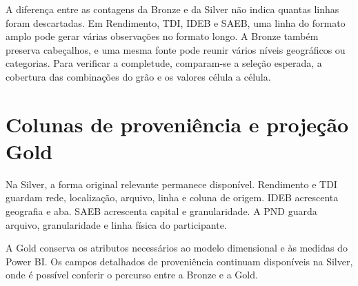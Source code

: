 A diferença entre as contagens da Bronze e da Silver não indica quantas linhas foram descartadas. Em Rendimento, TDI, IDEB e SAEB, uma linha do formato amplo pode gerar várias observações no formato longo. A Bronze também preserva cabeçalhos, e uma mesma fonte pode reunir vários níveis geográficos ou categorias. Para verificar a completude, comparam-se a seleção esperada, a cobertura das combinações do grão e os valores célula a célula.

\section{Colunas de proveniência e projeção Gold}

Na Silver, a forma original relevante permanece disponível. Rendimento e TDI guardam rede, localização, arquivo, linha e coluna de origem. IDEB acrescenta geografia e aba. SAEB acrescenta capital e granularidade. A PND guarda arquivo, granularidade e linha física do participante.

A Gold conserva os atributos necessários ao modelo dimensional e às medidas do Power BI. Os campos detalhados de proveniência continuam disponíveis na Silver, onde é possível conferir o percurso entre a Bronze e a Gold.
